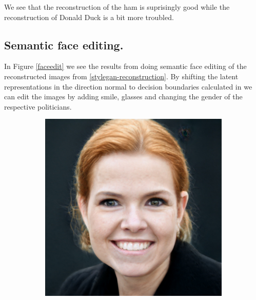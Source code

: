 We see that the reconstruction of the ham is suprisingly good while the reconstruction of Donald Duck is a bit more troubled. 

\subsection{Semantic face editing.}
In Figure \ref{faceedit} we see the results from doing semantic face editing of the reconstructed images from \ref{stylegan-reconstruction}. By shifting the latent representations in the direction normal to decision boundaries calculated in \cite{interfacegan} we can edit the images by adding smile, glasses and changing the gender of the respective politicians. 

\begin{figure}[h!]
    \centering
    \begin{subfigure}[b]{0.24\textwidth}
        \includegraphics[width=\textwidth]{fig/stylegan/faceedit/inger-smile}
    \end{subfigure}
    \begin{subfigure}[b]{0.24\textwidth}

\end{subfigure}
\end{figure}
